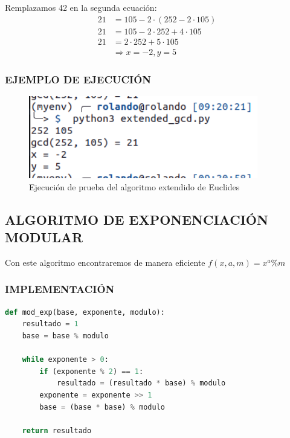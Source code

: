     Remplazamos 42 en la segunda ecuación:
    \begin{align*} 
        21 &=  105 - 2\cdot(252 - 2\cdot105)\\ 
        21 &=  105 - 2\cdot252 + 4\cdot105\\
        21 &=  2\cdot252 + 5\cdot105\\
        &\Rightarrow x = -2, y = 5 
    \end{align*}

    \subsubsection{EJEMPLO DE EJECUCIÓN}
    \begin{figure}[H]
        \centering
        \includegraphics[width=10cm]{images/euclides_extendido_prueba.png}
        \caption{Ejecución de prueba del algoritmo extendido de Euclides}
    \end{figure}

\subsection{ALGORITMO DE EXPONENCIACIÓN MODULAR}
Con este algoritmo encontraremos de manera eficiente $f(x,a,m) = x^a \% m$
    \subsubsection{IMPLEMENTACIÓN}
\begin{lstlisting}[language=Python]
def mod_exp(base, exponente, modulo):
    resultado = 1
    base = base % modulo
    
    while exponente > 0:
        if (exponente % 2) == 1:
            resultado = (resultado * base) % modulo
        exponente = exponente >> 1
        base = (base * base) % modulo
    
    return resultado
\end{lstlisting}

